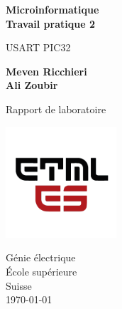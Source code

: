 \begin{titlepage}
   \begin{center}
        \vspace*{1cm}
        \LARGE
        \textbf{Microinformatique \\ Travail pratique 2}
        
        \vspace{0.3cm}
        USART PIC32
            
        \vspace{1.5cm}

        \textbf{Meven Ricchieri \\ Ali Zoubir}

        \vfill
            
        Rapport de  laboratoire
            
        \vspace{0.8cm}
     
        \includegraphics[width=0.31\textwidth]{./ETML-ES-LOGO.png}

        Génie électrique\\
        École supérieure\\
        Suisse\\
        \monthyeardate\today
            
   \end{center}
\end{titlepage}